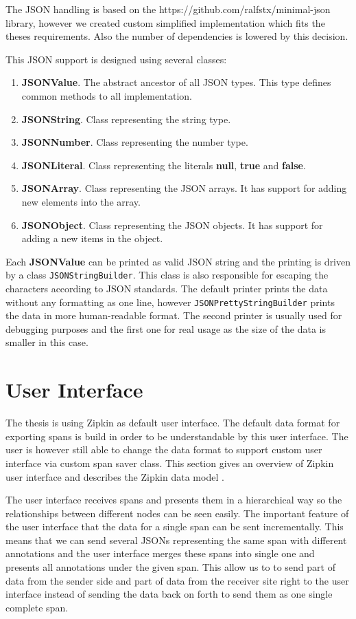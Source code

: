 The JSON handling is based on the https://github.com/ralfstx/minimal-json library, however we created custom simplified implementation which fits the theses requirements. Also the number of dependencies is lowered by this decision. 

This JSON support is designed using several classes:
\begin{enumerate}
	\item \textbf{JSONValue}. The abstract ancestor of all JSON types. This type defines common methods to all implementation.
	\item \textbf{JSONString}. Class representing the string type.
	\item \textbf{JSONNumber}. Class representing the number type.
	\item \textbf{JSONLiteral}. Class representing the literals \textbf{null}, \textbf{true} and \textbf{false}.
	\item \textbf{JSONArray}. Class representing the JSON arrays. It has support for adding new elements into the array.
	\item \textbf{JSONObject}. Class representing the JSON objects. It has support for adding a new items in the object.
\end{enumerate}

Each \textbf{JSONValue} can be printed as valid JSON string and the printing is driven by a class \texttt{JSONStringBuilder}. This class is also responsible for escaping the characters according to JSON standards. The default printer prints the data without any formatting as one line, however \texttt{JSONPrettyStringBuilder} prints the data in more human-readable format. The second printer is usually used for debugging purposes and the first one for real usage as the size of the data is smaller in this case.

\section{User Interface}
The thesis is using Zipkin as default user interface. The default data format for exporting spans is build in order to be understandable by this user interface. The user is however still able to change the data format to support custom user interface via custom span saver class. This section gives an overview of Zipkin user interface and describes the Zipkin data model
\label{sec:zipkin_ui}.

The user interface receives spans and presents them in a hierarchical way so the relationships between different nodes can be seen easily. The important feature of the user interface that the data for a single span can be sent incrementally. This means that we can send several JSONs representing the same span with different annotations and the user interface merges these spans into single one and presents all annotations under the given span. This allow us to to send part of data from the sender side and part of data from the receiver site right to the user interface instead of sending the data back on forth to send them as one single complete span.

